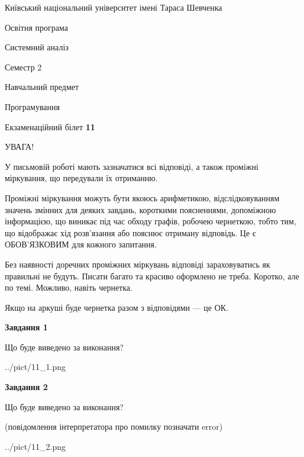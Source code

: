 \documentclass[12pt, ukrainian]{article}
\begin{document}
{{\begin {small}\par
{ \center  Київський національний університет імені Тараса Шевченка \par}
{\parbox {5 cm}{Освітня програма \hfill}{\parbox {7 cm}{Системний аналіз \hfill}}\parbox {6 cm}{\hfill Семестр 2}}\par
{\parbox {5 cm} {Навчальний предмет \hfill}\parbox {7 cm}{Програмування \hfill}\parbox {6cm}{\hfill}\par}\vspace{-7pt} \end{small}}{\center Екзаменаційний білет \No \textbf
{ 11 }\par}}
{
\begin {large}
УВАГА!

У письмовій роботі мають зазначатися всі відповіді, а також проміжні міркування, що передували їх отриманню.

Проміжні міркування можуть бути якоюсь арифметикою, відслідковуванням зна\-чень змінних для деяких завдань,
короткими поясненнями, допоміжною інформацією, що виникає під час обходу графів, робочею чернеткою,
тобто тим, що відображає хід розв’язання або пояснює отриману відповідь.
Це є ОБОВ’ЯЗКОВИМ для кожного запитання.

Без наявності доречних проміжних міркувань відповіді зараховуватись як правиль\-ні не будуть.
Писати багато та красиво оформлено не треба. Коротко, але по темі. Можли\-во, навіть чернетка.

Якщо на аркуші буде чернетка разом з відповідями --- це ОК.

\newpage

{\begin {center}\textbf{Завдання 1}\end {center}}\par
Що буде виведено за виконання?\par
\begin{center}
	{../pict/11_1.png}
\end{center}
\newpage

{\begin {center}\textbf{Завдання 2}\end {center}}\par
Що буде виведено за виконання?\par
 (повідомлення інтерпретатора про помилку позначати error)\par
\begin{center}
	{../pict/11_2.png}
\end{center}
\newpage


\end{large}}
\end{document}

